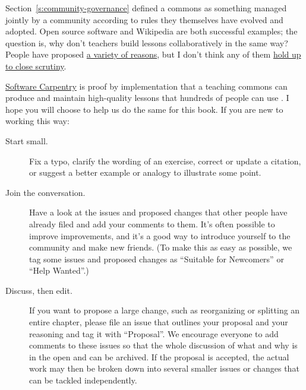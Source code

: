 Section~\ref{s:community-governance} defined a commons as something
managed jointly by a community according to rules they themselves have
evolved and adopted. Open source software and Wikipedia are both
successful examples; the question is, why don't teachers build lessons
collaboratively in the same way? People have proposed \href{http://blog.mrmeyer.com/2016/why-secondary-teachers-dont-want-a-github-for-lesson-plans/}{a variety of
reasons}, but I don't think any of them \href{http://third-bit.com/2016/04/29/why-teachers-dont-collaborate.html}{hold up to
close scrutiny}.

\href{http://software-carpentry.org}{Software Carpentry} is proof by implementation that a teaching
commons can produce and maintain high-quality lessons that hundreds of
people can use \cite{Wils2016}. I hope you will choose to help us
do the same for this book. If you are new to working this way:

\begin{description}
\item[Start small.]
Fix a typo, clarify the wording of an exercise, correct or update a
citation, or suggest a better example or analogy to illustrate some
point.
\item[Join the conversation.]
Have a look at the issues and proposed changes that other people
have already filed and add your comments to them. It's often
possible to improve improvements, and it's a good way to introduce
yourself to the community and make new friends. (To make this as
easy as possible, we tag some issues and proposed changes as
``Suitable for Newcomers'' or ``Help Wanted''.)
\item[Discuss, then edit.]
If you want to propose a large change, such as reorganizing or
splitting an entire chapter, please file an issue that outlines your
proposal and your reasoning and tag it with ``Proposal''. We encourage
everyone to add comments to these issues so that the whole
discussion of what and why is in the open and can be archived. If
the proposal is accepted, the actual work may then be broken down
into several smaller issues or changes that can be tackled
independently.
\end{description}
